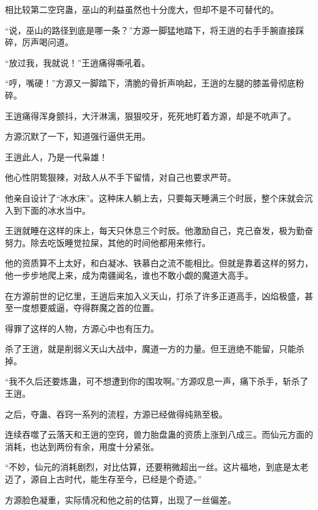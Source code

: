 \begin{this_body}
相比较第二空窍蛊，巫山的利益虽然也十分庞大，但却不是不可替代的。

“说，巫山的路径到底是哪一条？”方源一脚猛地踏下，将王逍的右手手腕直接踩碎，厉声喝问道。

“放过我，我就说！”王逍痛得嘶吼着。

“哼，嘴硬！”方源又一脚踏下，清脆的骨折声响起，王逍的左腿的膝盖骨彻底粉碎。

王逍痛得浑身颤抖，大汗淋漓，狠狠咬牙，死死地盯着方源，却是不吭声了。

方源沉默了一下，知道强行逼供无用。

王逍此人，乃是一代枭雄！

他心性阴鸷狠辣，对敌人从不手下留情，对自己也要求严苛。

他亲自设计了“冰水床”。这种床人躺上去，只要每天睡满三个时辰，整个床就会沉入到下面的冰水当中。

王逍就睡在这样的床上，每天只休息三个时辰。他激励自己，克己奋发，极为勤奋努力。除去吃饭睡觉拉屎，其他的时间他都用来修行。

他的资质算不上太好，和白凝冰、铁慕白之流不能相比。但就是靠着这样的努力，他一步步地爬上来，成为南疆闻名，谁也不敢小觑的魔道大高手。

在方源前世的记忆里，王逍后来加入义天山，打杀了许多正道高手，凶焰极盛，甚至一度想要威逼，夺得群魔之首的位置。

得罪了这样的人物，方源心中也有压力。

杀了王逍，就是削弱义天山大战中，魔道一方的力量。但王逍绝不能留，只能杀掉。

“我不久后还要炼蛊，可不想遭到你的围攻啊。”方源叹息一声，痛下杀手，斩杀了王逍。

之后，夺蛊、吞窍一系列的流程，方源已经做得纯熟至极。

连续吞噬了云落天和王逍的空窍，兽力胎盘蛊的资质上涨到八成三。而仙元方面的消耗，也达到两份有余，用度十分紧张。

“不妙，仙元的消耗剧烈，对比估算，还要稍微超出一丝。这片福地，到底是太老迈了，源自上古时代，能生存至今，已经是个奇迹。”

方源脸色凝重，实际情况和他之前的估算，出现了一丝偏差。

\end{this_body}

